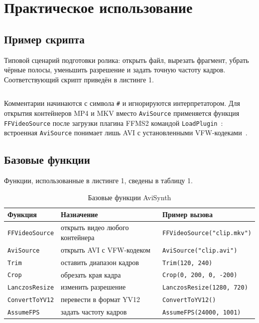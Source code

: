 \section{Практическое использование}

\subsection{Пример скрипта}
Типовой сценарий подготовки ролика: открыть файл, вырезать фрагмент,
убрать чёрные полосы, уменьшить разрешение и задать точную частоту кадров.
Соответствующий скрипт приведён в листинге 1.

\inputminted{text}{code/AviSynthScript.avs}

Комментарии начинаются с символа \verb|#| и игнорируются интерпретатором.
Для открытия контейнеров MP4 и MKV вместо \texttt{AviSource} применяется
функция \texttt{FFVideoSource} после загрузки плагина FFMS2 командой
\texttt{LoadPlugin}~\cite{ffms2}: встроенная \texttt{AviSource} понимает
лишь AVI с установленными VFW-кодеками~\cite{avisynth}.

\subsection{Базовые функции}
Функции, использованные в листинге 1, сведены в таблицу 1.

\begin{table}[H]
  \centering
  \small
  \begin{tabular}{|l|l|l|}
    \hline
    Функция & Назначение & Пример вызова \\
    \hline
    \texttt{FFVideoSource} & открыть видео любого контейнера & \texttt{FFVideoSource("clip.mkv")} \\
    \texttt{AviSource} & открыть AVI с VFW-кодеком & \texttt{AviSource("clip.avi")} \\
    \texttt{Trim} & оставить диапазон кадров & \texttt{Trim(120, 240)} \\
    \texttt{Crop} & обрезать края кадра & \texttt{Crop(0, 200, 0, -200)} \\
    \texttt{LanczosResize} & изменить разрешение & \texttt{LanczosResize(1280, 720)} \\
    \texttt{ConvertToYV12} & перевести в формат YV12 & \texttt{ConvertToYV12()} \\
    \texttt{AssumeFPS} & задать частоту кадров & \texttt{AssumeFPS(24000, 1001)} \\
    \hline
  \end{tabular}
  \caption{Базовые функции AviSynth}
\end{table}

